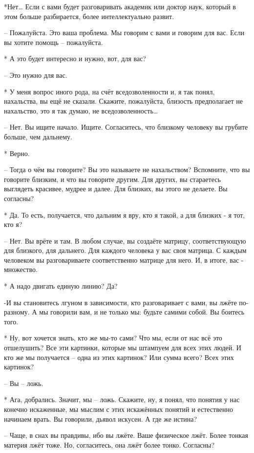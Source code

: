  *Нет… Если с вами будет разговаривать академик или доктор наук, который в этом больше разбирается, более интеллектуально развит.

 – Пожалуйста. Это ваша проблема. Мы говорим с вами и говорим для вас. Если вы хотите помощь – пожалуйста.

 * А это будет интересно и нужно, вот, для вас?

 – Это нужно для вас.

 * У меня вопрос иного рода, на счёт вседозволенности и, я так понял, нахальства, вы ещё не сказали. Скажите, пожалуйста, близость предполагает не нахальство, это я так думаю, не вседозволенность…

 – Нет. Вы ищите начало. Ищите. Согласитесь, что близкому человеку вы грубите больше, чем дальнему.

 * Верно.

 – Тогда о чём вы говорите? Вы это называете не нахальством? Вспомните, что вы говорите близким, и что вы говорите другим. Для других, вы стараетесь выглядеть красивее, мудрее и далее. Для близких, вы этого не делаете. Вы согласны?

 * Да. То есть, получается, что дальним я вру, кто я такой, а для близких - я тот, кто я?

 – Нет. Вы врёте и там. В любом случае, вы создаёте матрицу, соответствующую для  близкого, для дальнего. Для каждого человека у вас своя матрица. С каждым человеком вы разговариваете соответственно матрице для него. И, в итоге, вас - множество.

 * А надо двигать единую линию? Да?

 -И вы становитесь лгуном в зависимости, кто разговаривает с вами, вы лжёте по-разному. А мы говорили вам, и не только мы:  будьте самими собой. Вы боитесь того.

 * Ну, вот хочется знать, кто же мы-то сами? Что мы, если от нас всё это отшелушить? Все эти картинки, которые мы штампуем для всех этих людей. И кто же мы получается – одна из этих картинок? Или сумма всего? Всех этих картинок?

 – Вы – ложь.

 * Ага, добрались. Значит, мы – ложь. Скажите, ну, я понял, что понятия у нас конечно искаженные, мы мыслим с этих искажённых понятий и естественно начинаем врать. Вы говорили, дьявол искусен. А где же истина?

 – Чаще, в снах вы правдивы, ибо вы лжёте. Ваше физическое лжёт. Более тонкая материя лжёт тоже. Но, согласитесь, она лжёт более тонко. Согласны?

